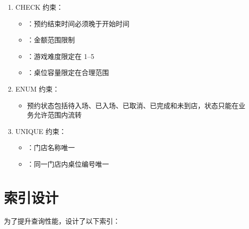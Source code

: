 \begin{enumerate}
  \item CHECK 约束：
    \begin{itemize}
      \item {}：预约结束时间必须晚于开始时间
      \item {}：金额范围限制
      \item {}：游戏难度限定在 1--5
      \item {}：桌位容量限定在合理范围
    \end{itemize}
  \item ENUM 约束：
    \begin{itemize}
      \item 预约状态包括待入场、已入场、已取消、已完成和未到店，状态只能在业务允许范围内流转
    \end{itemize}
  \item UNIQUE 约束：
    \begin{itemize}
      \item {}：门店名称唯一
      \item {}：同一门店内桌位编号唯一
    \end{itemize}
\end{enumerate}

\section{索引设计}

为了提升查询性能，设计了以下索引：

